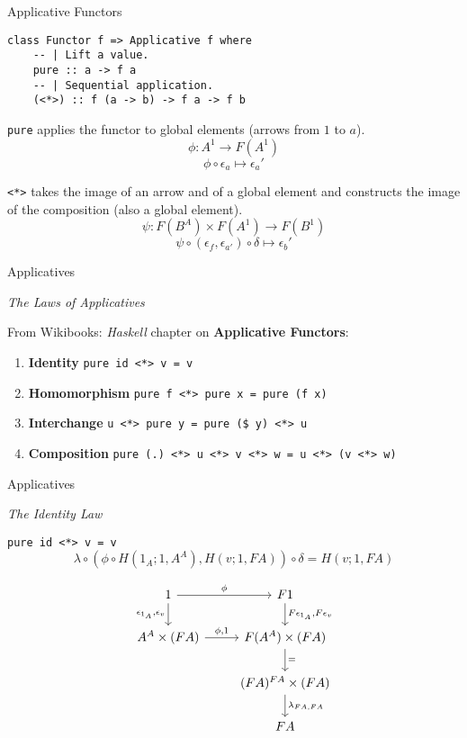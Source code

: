 \documentclass[10pt]{beamer}
\newcommand{\Com}[3]{#3^{#2}}
\newcommand{\strong}[1]{\textbf{#1}}
\theoremstyle{definition}
\theoremstyle{remark}
\numberwithin{equation}{section}
\begin{document}
\begin{frame}[fragile]{Applicative Functors}

  \begin{lstlisting}[frame=single]
class Functor f => Applicative f where
    -- | Lift a value.
    pure :: a -> f a
    -- | Sequential application.
    (<*>) :: f (a -> b) -> f a -> f b
  \end{lstlisting}

  \lstinline{pure} applies the functor to global elements (arrows from $1$ to $a$).
  \[
  \phi : \Com{Hask}{1}{A} \rightarrow F(\Com{Hask}{1}{A})
  \]
  \[
  \phi \circ \epsilon_a \mapsto \epsilon_a'
  \]

  \lstinline{<*>} takes the image of an arrow and of a global element and constructs the image of the composition (also a global element).
  \[
  \psi : F (\Com{Hask}{A}{B}) \times F(\Com{Hask}{1}{A}) \rightarrow F(\Com{Hask}{1}{B})
  \]
  \[
  \psi \circ (\epsilon_{f},\epsilon_{a'}) \circ \delta \mapsto \epsilon_b'
  \]

\end{frame}

\begin{frame}[fragile]{Applicatives}

  \emph{The Laws of Applicatives}

  From Wikibooks: \emph{Haskell} chapter on \strong{Applicative Functors}:
  
  \begin{enumerate}
  \item \strong{Identity}     \lstinline{pure id <*> v = v}
  \item \strong{Homomorphism} \lstinline{pure f <*> pure x = pure (f x)}
  \item \strong{Interchange}  \lstinline{u <*> pure y = pure ($ y) <*> u}
  \item \strong{Composition}  \lstinline{pure (.) <*> u <*> v <*> w = u <*> (v <*> w)}
  \end{enumerate}

\end{frame}

\begin{frame}[fragile]{Applicatives}

  \emph{The Identity Law}

  \lstinline{pure id <*> v = v}
  \[
  \lambda \circ (\phi \circ H(1_A;1,A^A),H(v;1,F A)) \circ \delta = H(v;1,F A)
  \]

  \[
  \begin{tikzcd}
    1 \arrow{r}{\phi}\arrow{d}[swap]{\epsilon_{1_A},\epsilon_v} & F 1 \arrow{d}{F \epsilon_{1_A},F \epsilon_v} \\
    \Com{C}{A}{A}\times (F A) \arrow{r}{\phi,1} & F (\Com{C}{A}{A}) \times (F A) \arrow{d}{=} \\
    & \Com{C}{F A}{(F A)} \times (F A) \arrow{d}{\lambda_{FA,FA}} \\
    & F A
  \end{tikzcd}
  \]

\end{frame}
\end{document}
